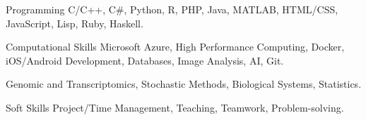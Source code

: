 

\begin{cvskills}

  \cvskill
    {Programming} %
    {C/C++, C\#, Python, R, PHP, Java, MATLAB, HTML/CSS, JavaScript,
    Lisp, Ruby, Haskell.} %
    

    \cvskill
      {Computational Skills} %
      {Microsoft Azure, High Performance Computing, Docker, iOS/Android Development, Databases, Image Analysis, 
      AI, Git.} %


    {Genomic and Transcriptomics,
    Stochastic Methods, Biological Systems, Statistics.}



\vspace{0.2cm}
  \cvskill
    {Soft Skills} %
    {Project/Time Management, Teaching, Teamwork,
    Problem-solving.} %

\end{cvskills}
